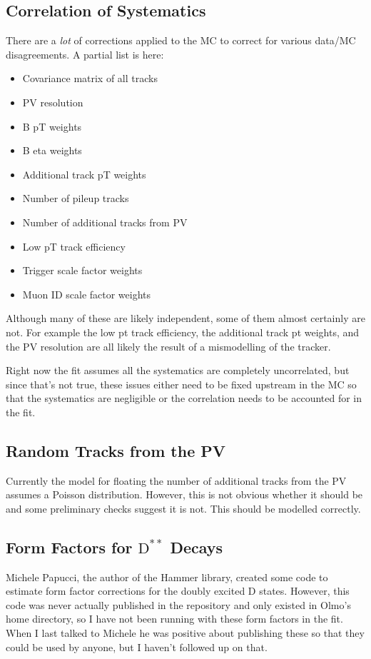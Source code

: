 \documentclass[12pt]{report}
\begin{document}
\subsection{Correlation of Systematics}
There are a \emph{lot} of corrections applied to the MC to correct for various
data/MC disagreements. A partial list is here:
\begin{itemize}
\item Covariance matrix of all tracks
\item PV resolution
\item B pT weights
\item B eta weights
\item Additional track pT weights
\item Number of pileup tracks
\item Number of additional tracks from PV
\item Low pT track efficiency
\item Trigger scale factor weights
\item Muon ID scale factor weights
\end{itemize}
Although many of these are likely independent, some of them almost certainly
are not. For example the low pt track efficiency, the additional track pt
weights, and the PV resolution are all likely the result of a mismodelling of
the tracker.

Right now the fit assumes all the systematics are completely uncorrelated, but
since that's not true, these issues either need to be fixed upstream in the MC
so that the systematics are negligible or the correlation needs to be accounted
for in the fit.
\subsection{Random Tracks from the PV}
Currently the model for floating the number of additional tracks from the PV
assumes a Poisson distribution. However, this is not obvious whether it should
be and some preliminary checks suggest it is not. This should be modelled
correctly.
\subsection{Form Factors for $\mathrm{D}^{**}$ Decays}
Michele Papucci, the author of the Hammer library, created some code to
estimate form factor corrections for the doubly excited D states. However, this
code was never actually published in the repository and only existed in Olmo's
home directory, so I have not been running with these form factors in the fit.
When I last talked to Michele he was positive about publishing these so that
they could be used by anyone, but I haven't followed up on that.
\end{document}

